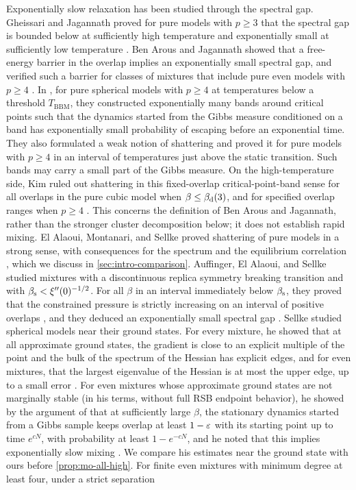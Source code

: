 Exponentially slow relaxation has been studied through the spectral gap. Gheissari and Jagannath proved for pure models with $p\ge3$ that the spectral gap is bounded below at sufficiently high temperature and exponentially small at sufficiently low temperature \cite[Theorem~1]{GheissariJagannath2019}. Ben Arous and Jagannath showed that a free-energy barrier in the overlap implies an exponentially small spectral gap, and verified such a barrier for classes of mixtures that include pure even models with $p\ge4$ \cite[Theorems~1.24--1.26]{BenArousJagannath2018}. In \cite{BenArousJagannath2024}, for pure spherical models with $p\ge4$ at temperatures below a threshold $T_{\mathrm{BBM}}$, they constructed exponentially many bands around critical points such that the dynamics started from the Gibbs measure conditioned on a band has exponentially small probability of escaping before an exponential time. They also formulated a weak notion of shattering and proved it for pure models with $p\ge4$ in an interval of temperatures just above the static transition. Such bands may carry a small part of the Gibbs measure. On the high-temperature side, Kim ruled out shattering in this fixed-overlap critical-point-band sense for all overlaps in the pure cubic model when $\beta\le\beta_{\mathrm d}(3)$, and for specified overlap ranges when $p\ge4$ \cite[Theorem~1.1 and Corollary~1.2]{Kim2026nonshattering}. This concerns the definition of Ben Arous and Jagannath, rather than the stronger cluster decomposition below; it does not establish rapid mixing. El Alaoui, Montanari, and Sellke proved shattering of pure models in a strong sense, with consequences for the spectrum and the equilibrium correlation \cite{ElAlaouiMontanariSellke2025}, which we discuss in \cref{sec:intro-comparison}. Auffinger, El Alaoui, and Sellke studied mixtures with a discontinuous replica symmetry breaking transition and with $\beta_{\mathrm s}<\xi''(0)^{-1/2}$. For all $\beta$ in an interval immediately below $\beta_{\mathrm s}$, they proved that the constrained pressure is strictly increasing on an interval of positive overlaps \cite[Theorem~1.1]{AuffingerElAlaouiSellke2025}, and they deduced an exponentially small spectral gap \cite[Remark~1.2]{AuffingerElAlaouiSellke2025}. Sellke studied spherical models near their ground states. For every mixture, he showed that at all approximate ground states, the gradient is close to an explicit multiple of the point and the bulk of the spectrum of the Hessian has explicit edges, and for even mixtures, that the largest eigenvalue of the Hessian is at most the upper edge, up to a small error \cite[Proposition~1.2 and Theorem~1.3]{Sellke2025marginal}. For even mixtures whose approximate ground states are not marginally stable (in his terms, without full RSB endpoint behavior), he showed by the argument of \cite[Corollary~2.9]{ElAlaouiMontanariSellke2025} that at sufficiently large $\beta$, the stationary dynamics started from a Gibbs sample keeps overlap at least $1-\varepsilon$ with its starting point up to time $e^{cN}$, with probability at least $1-e^{-cN}$, and he noted that this implies exponentially slow mixing \cite[Corollary~1.6]{Sellke2025marginal}. We compare his estimates near the ground state with ours before \cref{prop:mo-all-high}. For finite even mixtures with minimum degree at least four, under a strict separation 